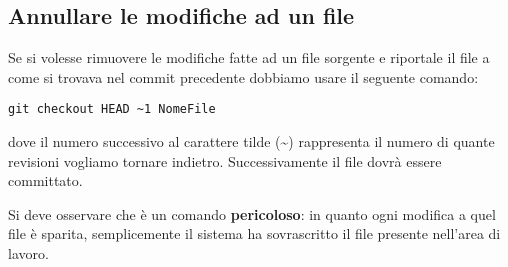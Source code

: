 \subsection{Annullare le modifiche ad un file}
Se si volesse rimuovere le modifiche fatte ad un file sorgente e riportale il file a come si trovava nel commit precedente dobbiamo usare il seguente comando:

\begin{center}
\texttt{git checkout HEAD \textasciitilde 1 NomeFile}

\end{center}

dove il numero successivo al carattere tilde (\textasciitilde) rappresenta il numero di quante revisioni vogliamo tornare indietro. Successivamente il file dovrà essere committato.

Si deve osservare che è un comando \textbf{pericoloso}: in quanto ogni modifica a quel file è sparita, semplicemente il sistema ha sovrascritto il file presente nell'area di lavoro.